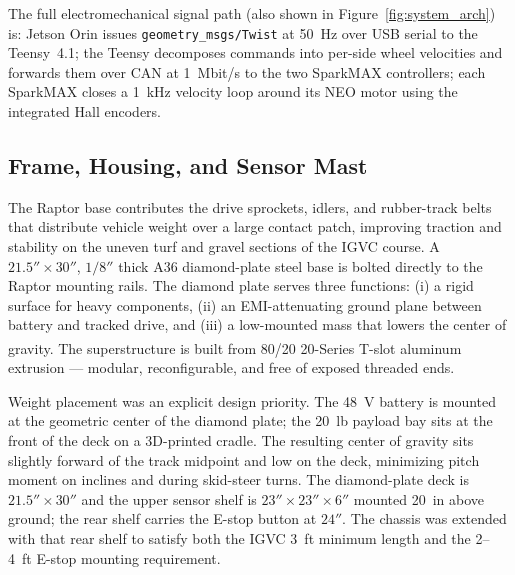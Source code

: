 \documentclass[12pt, letterpaper]{article}
\begin{document}
The full electromechanical signal path (also shown in Figure~\ref{fig:system_arch})
is: Jetson Orin issues
\texttt{geometry\_msgs/Twist} at 50~Hz over USB serial to the Teensy~4.1; the Teensy
decomposes commands into per-side wheel velocities and forwards them over CAN at
1~Mbit/s to the two SparkMAX controllers; each SparkMAX closes a 1~kHz velocity loop
around its NEO motor using the integrated Hall encoders.

\subsection{Frame, Housing, and Sensor Mast}

The Raptor base contributes the drive sprockets, idlers, and rubber-track belts that
distribute vehicle weight over a large contact patch, improving traction and stability
on the uneven turf and gravel sections of the IGVC course. A $21.5'' \times 30''$,
$1/8''$ thick A36 diamond-plate steel base is bolted directly to the Raptor mounting
rails. The diamond plate serves three functions: (i) a rigid surface for heavy
components, (ii) an EMI-attenuating ground plane between battery and tracked drive, and
(iii) a low-mounted mass that lowers the center of gravity. The superstructure is built
from 80/20\textsuperscript{\textregistered} 20-Series T-slot aluminum extrusion --- modular,
reconfigurable, and free of exposed threaded ends.

Weight placement was an explicit design priority. The 48~V battery is mounted at the
geometric center of the diamond plate; the 20~lb payload bay sits at the front of the
deck on a 3D-printed cradle. The resulting center of gravity sits slightly forward of
the track midpoint and low on the deck, minimizing pitch moment on inclines and during
skid-steer turns. The diamond-plate deck is $21.5'' \times 30''$ and the upper sensor
shelf is $23'' \times 23'' \times 6''$ mounted 20~in above ground; the rear shelf
carries the E-stop button at $24''$. The chassis was extended with that rear shelf to
satisfy both the IGVC 3~ft minimum length and the 2--4~ft E-stop mounting requirement.
\end{document}
